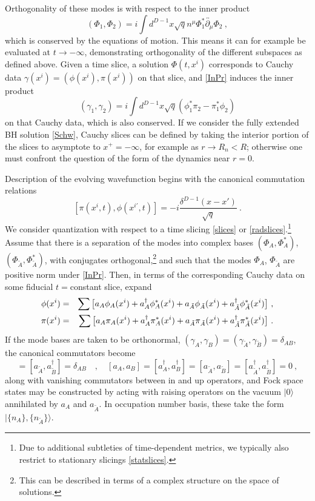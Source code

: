 \documentclass[12pt]{article}
\numberwithin{equation}{section}
\newcommand{\beq}{\begin{equation}}
\newcommand{\eeq}{\end{equation}}
\newcommand{\bea}{\begin{eqnarray}}
\newcommand{\eea}{\end{eqnarray}}
\newcommand{\tA}{{\tilde A}}
\newcommand{\tB}{{\tilde B}}
\begin{document}
Orthogonality of these modes is with respect to the inner product
\beq\label{InPr}
(\Phi_1,\Phi_2) = i \int d^{D-1} x \sqrt{q} n^\mu \Phi_1^*\overleftrightarrow{\partial_\mu} \Phi_2\ ,
\eeq
which is conserved by the equations of motion.  This means it can for example be evaluated at $t\rightarrow-\infty$, demonstrating orthogonality of the different subspaces as defined above.  Given a time slice, a solution $\Phi(t,x^i)$ corresponds to Cauchy data $\gamma(x^i)=(\phi(x^i),\pi(x^i))$ on that slice, and \eqref{InPr} induces the inner product
\beq\label{CauPr}
(\gamma_1,\gamma_2)= i\int d^{D-1}x \sqrt{q}(\phi_1^*\pi_2-\pi_1^*\phi_2)
\eeq
on that Cauchy data, which is also conserved.  If we consider the fully extended BH solution \eqref{Schw}, Cauchy slices can be defined by taking the interior portion of the slices to asymptote to $x^+=-\infty$, for example as $r\rightarrow R_n<R$; otherwise one must confront the question of the form of the dynamics near $r=0$.

Description of the evolving wavefunction begins with the canonical commutation relations 
\beq\label{CCR}
[\pi(x^i, t), \phi(x^{i\prime}, t)]=-i \frac{\delta^{D-1}(x-x')}{\sqrt{q}}\ .
\eeq
We consider quantization with respect to a time slicing \eqref{slices} or \eqref{radslices}.\footnote{Due to additional subtleties of time-dependent metrics\cite{ToVa,CMOV,CFMM,AgAs,MuOe}, we typically also restrict to stationary slicings \eqref{statslices}.}  Assume that there is a separation of the modes into complex bases $(\Phi_A,\Phi^*_A)$, $(\Phi_{\tilde A},\Phi^*_{\tilde A})$, with conjugates orthogonal,\footnote{This can be described in terms of a complex structure on the space of solutions.} and such that the modes $\Phi_A$, $\Phi_{\tilde A}$ are positive norm under \eqref{InPr}.  Then, in terms of the corresponding Cauchy data on some fiducial $t=$constant slice, expand
\bea\label{piphiexps}
\phi(x^i) &=& \sum \big[a_A \phi_A(x^i)+a_A^{\dagger} \phi_A^*(x^i)+ a_\tA \phi_\tA(x^i)+a_\tA^{\dagger} \phi_\tA^*(x^i)\big]\  ,\cr
\pi(x^i) &=& \sum \big[a_A\pi_A(x^i)+a_A^{\dagger} \pi_A^*(x^i)+a_\tA\pi_\tA(x^i)+a_\tA^{\dagger} \pi_\tA^*(x^i)\big]\ .
\eea
If the mode bases are taken to be orthonormal, $(\gamma_A,\gamma_B)=(\gamma_\tA,\gamma_\tB)=\delta_{AB}$, the canonical commutators become
\beq
[a_A, a_B^{\dagger}] = [a_\tA, a_\tB^{\dagger}] =\delta_{AB}\quad ,\quad  [a_A, a_B]=[a_A^{\dagger}, a_B^{\dagger}] = [a_\tA, a_\tB]=[a_\tA^{\dagger}, a_\tB^{\dagger}] =0\ ,
\eeq
along with vanishing commutators between in and up operators, 
and Fock space states may be constructed by acting with raising operators on the vacuum $|0\rangle$ annihilated by $a_A$ and $a_\tA$.  In occupation number basis, these take the form $|\{n_A\},\{n_\tA\}\rangle$.
\end{document}
